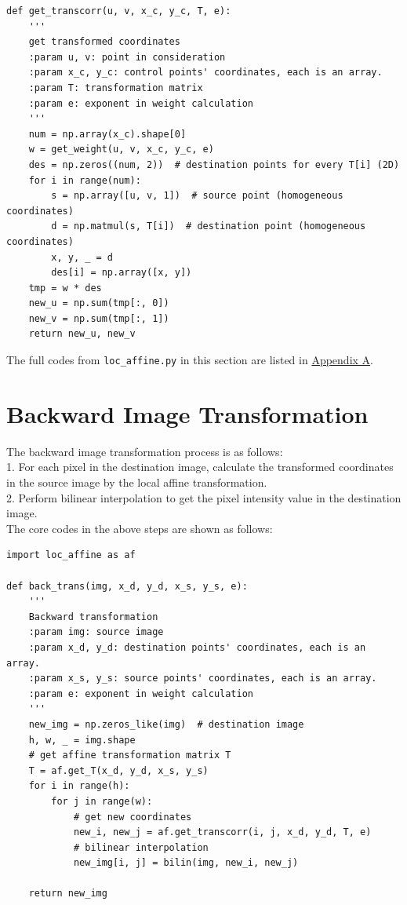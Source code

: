 \documentclass[UTF8]{ctexart}
\begin{document}
\begin{lstlisting}
def get_transcorr(u, v, x_c, y_c, T, e):
    '''
    get transformed coordinates
    :param u, v: point in consideration
    :param x_c, y_c: control points' coordinates, each is an array.
    :param T: transformation matrix
    :param e: exponent in weight calculation
    '''
    num = np.array(x_c).shape[0]
    w = get_weight(u, v, x_c, y_c, e)
    des = np.zeros((num, 2))  # destination points for every T[i] (2D)
    for i in range(num):
        s = np.array([u, v, 1])  # source point (homogeneous coordinates)
        d = np.matmul(s, T[i])  # destination point (homogeneous coordinates)
        x, y, _ = d
        des[i] = np.array([x, y])
    tmp = w * des
    new_u = np.sum(tmp[:, 0])
    new_v = np.sum(tmp[:, 1])
    return new_u, new_v
\end{lstlisting}


The full codes from \texttt{loc\_affine.py} in this section are listed in \hyperlink{code1}{Appendix A}.


\section{Backward Image Transformation}

The backward image transformation process is as follows:\\
1. For each pixel in the destination image, calculate the transformed coordinates in the source image by the local affine transformation.\\
2. Perform bilinear interpolation to get the pixel intensity value in the destination image.\\

The core codes in the above steps are shown as follows:\\
\begin{lstlisting}
import loc_affine as af

def back_trans(img, x_d, y_d, x_s, y_s, e):
    '''
    Backward transformation
    :param img: source image
    :param x_d, y_d: destination points' coordinates, each is an array.
    :param x_s, y_s: source points' coordinates, each is an array.
    :param e: exponent in weight calculation
    '''
    new_img = np.zeros_like(img)  # destination image
    h, w, _ = img.shape
    # get affine transformation matrix T
    T = af.get_T(x_d, y_d, x_s, y_s)
    for i in range(h):
        for j in range(w):
            # get new coordinates
            new_i, new_j = af.get_transcorr(i, j, x_d, y_d, T, e)
            # bilinear interpolation
            new_img[i, j] = bilin(img, new_i, new_j)
    
    return new_img
\end{lstlisting}
\end{document}
